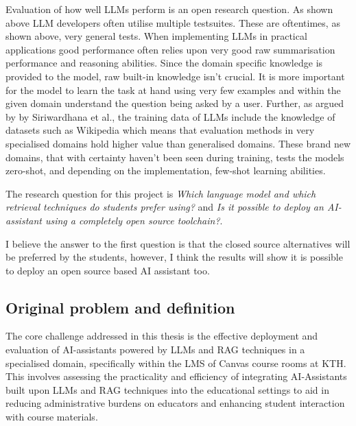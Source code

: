 Evaluation of how well LLMs perform is an open research question. As shown above LLM developers often utilise multiple testsuites. These are oftentimes, as shown above, very general tests. When implementing LLMs in practical applications good performance often relies upon very good raw summarisation performance and reasoning abilities. Since the domain specific knowledge is provided to the model, raw built-in knowledge isn’t crucial. It is more important for the model to learn the task at hand using very few examples and within the given domain understand the question being asked by a user.
Further, as argued by by Siriwardhana et al., the training data of LLMs include the knowledge of datasets such as Wikipedia \cite{siriwardhana_improving_2023} which means that evaluation methods in very specialised domains hold higher value than generalised domains. These brand new domains, that with certainty haven't been seen during training, tests the models zero-shot, and depending on the implementation, few-shot learning abilities.

The research question for this project is \textit{Which language model and which retrieval techniques do students prefer using?} and \textit{Is it possible to deploy an AI-assistant using a completely open source toolchain?}.

I believe the answer to the first question is that the closed source alternatives will be preferred by the students, however, I think the results will show it is possible to deploy an open source based AI assistant too.

\subsection{Original problem and definition}
\label{sec:researchQuestion}



The core challenge addressed in this thesis is the effective deployment and evaluation of AI-assistants powered by \gls{LLMs} and \gls{RAG} techniques in a specialised domain, specifically within the \gls{LMS} of Canvas course rooms at KTH. This involves assessing the practicality and efficiency of integrating AI-Assistants built upon LLMs and RAG techniques into the educational settings to aid in reducing administrative burdens on educators and enhancing student interaction with course materials.

